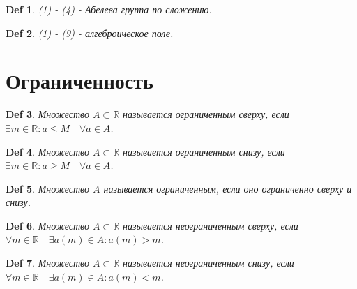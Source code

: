 \documentclass[a5paper, 10pt]{article}
\theoremstyle{plain}
\newtheorem*{definition_}{Def}
\newcommand{\R}{\mathbb R}
\begin{document}
	\begin{definition_}
		(1) - (4) - Абелева группа по сложению.
	\end{definition_}

	\begin{definition_}
		(1) - (9) - алгеброическое поле.
	\end{definition_}

	\section{Ограниченность}

	\begin{definition_}
	Множество $ A \subset \R $ называется ограниченным сверху, если
	$ \exists m \in \R: a \leqslant M \quad \forall a \in A $.
	\end{definition_}

	\begin{definition_}
	Множество $ A \subset \R $ называется ограниченным снизу, если
	$ \exists m \in \R: a \geqslant M \quad \forall a \in A $.
	\end{definition_}

	\begin{definition_}
	Множество $ A $ называется ограниченным, если оно ограниченно сверху и снизу.
	\end{definition_}

	\begin{definition_}
	Множество $ A \subset \R $ называется неограниченным сверху, если
	$ \forall m \in \R \quad \exists a(m) \in A: a(m) > m $.
	\end{definition_}

	\begin{definition_}
	Множество $ A \subset \R $ называется неограниченным снизу, если
	$ \forall m \in \R \quad \exists a(m) \in A: a(m) < m $.
	\end{definition_}
\end{document}
